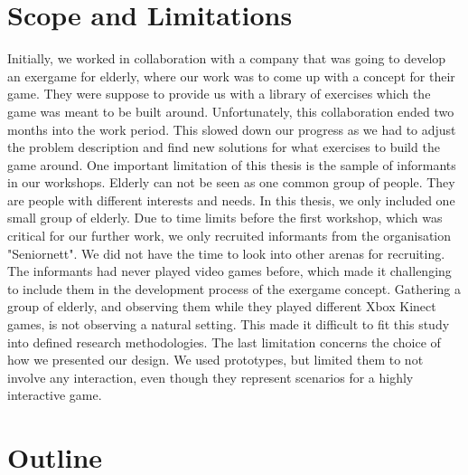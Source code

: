 \section{Scope and Limitations}
Initially, we worked in collaboration with a company that was going to develop an exergame for elderly, where our work was to come up with a concept for their game. They were suppose to provide us with a library of exercises which the game was meant to be built around. Unfortunately, this collaboration ended two months into the work period. This slowed down our progress as we had to adjust the problem description and find new solutions for what exercises to build the game around. One important limitation of this thesis is the sample of informants in our workshops. Elderly can not be seen as one common group of people. They are people with different interests and needs. In this thesis, we only included one small group of elderly. Due to time limits before the first workshop, which was critical for our further work, we only recruited informants from the organisation "Seniornett". We did not have the time to look into other arenas for recruiting. The informants had never played video games before, which made it challenging to include them in the development process of the exergame concept. Gathering a group of elderly, and observing them while they played different Xbox Kinect games, is not observing a natural setting. This made it difficult to fit this study into defined research methodologies. The last limitation concerns the choice of how we presented our design. We used prototypes, but limited them to not involve any interaction, even though they represent scenarios for a highly interactive game.  


\section{Outline}